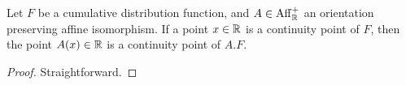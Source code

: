 \begin{lemma}
  \label{lem:cdf-continuity-pt-transform}
  Let $F$ be a cumulative distribution function,
  and $A \in \mathrm{Aff}^+_{\mathbb{R}}$ an orientation preserving affine isomorphism.
  If a point $x \in \mathbb{R}$ is a continuity point of $F$, then
  the point $A(x) \in \mathbb{R}$ is a continuity point of $A.F$.
\end{lemma}
\begin{proof}
  \uses{}
  Straightforward.
\end{proof}


%
%
